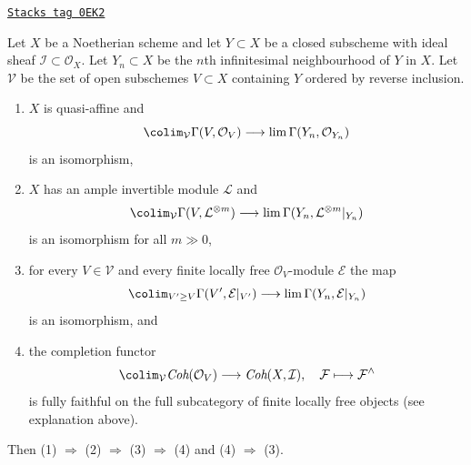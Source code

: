 \begin{lemma}
\label{algebraization-lemma-completion-fully-faithful-general}
\href{https://stacks.math.columbia.edu/tag/0EK2}{\texttt{Stacks tag 0EK2}}

Let $X$ be a Noetherian scheme and let $Y \subset X$ be a closed subscheme
with ideal sheaf $\mathcal{I} \subset \mathcal{O}_X$.
Let $Y_n \subset X$ be the $n$th infinitesimal neighbourhood of $Y$ in $X$.
Let $\mathcal{V}$ be the set of open subschemes $V \subset X$ containing $Y$
ordered by reverse inclusion.
\begin{enumerate}
\item $X$ is quasi-affine and
$$
\colim_\mathcal{V} \Gamma(V, \mathcal{O}_V)
\longrightarrow
\lim \Gamma(Y_n, \mathcal{O}_{Y_n})
$$
is an isomorphism,
\item $X$ has an ample invertible module $\mathcal{L}$ and
$$
\colim_\mathcal{V} \Gamma(V, \mathcal{L}^{\otimes m})
\longrightarrow
\lim \Gamma(Y_n, \mathcal{L}^{\otimes m}|_{Y_n})
$$
is an isomorphism for all $m \gg 0$,
\item for every $V \in \mathcal{V}$ and every finite locally free
$\mathcal{O}_V$-module $\mathcal{E}$ the map
$$
\colim_{V' \geq V} \Gamma(V', \mathcal{E}|_{V'})
\longrightarrow
\lim \Gamma(Y_n, \mathcal{E}|_{Y_n})
$$
is an isomorphism, and
\item the completion functor
$$
\colim_\mathcal{V} \textit{Coh}(\mathcal{O}_V)
\longrightarrow
\textit{Coh}(X, \mathcal{I}),
\quad
\mathcal{F} \longmapsto \mathcal{F}^\wedge
$$
is fully faithful on the full subcategory of
finite locally free objects (see explanation above).
\end{enumerate}
Then (1) $\Rightarrow$ (2) $\Rightarrow$ (3) $\Rightarrow$ (4)
and (4) $\Rightarrow$ (3).
\end{lemma}

